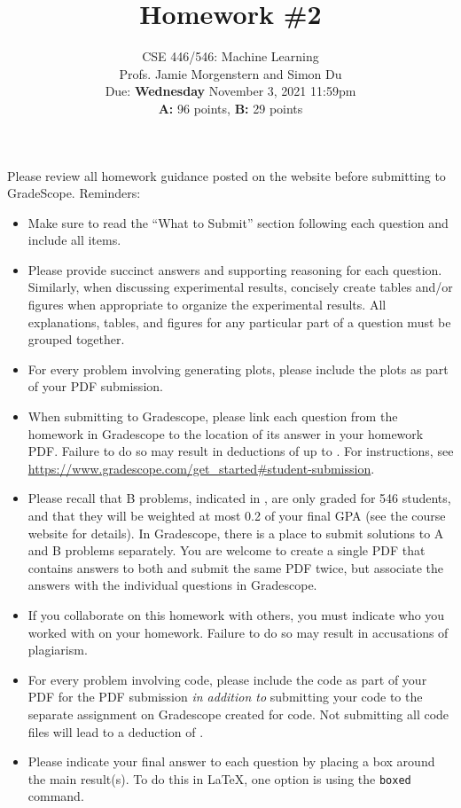 \documentclass{article}
\begin{document}
\setcounter{aprob}{0}
\setcounter{bprob}{0}
\title{Homework \#2}
\author{
    \normalsize{CSE 446/546: Machine Learning}\\
    \normalsize{Profs. Jamie Morgenstern and Simon Du}\\
    \normalsize{Due: \textbf{Wednesday} November 3, 2021 11:59pm}\\
    \normalsize{\textbf{A:} 96 points, \textbf{B:} 29 points}
}
\date{{}}
\maketitle

\noindent Please review all homework guidance posted on the website before submitting to GradeScope. Reminders:
\begin{itemize}
    \item Make sure to read the ``What to Submit'' section following each question and include all items.
    \item Please provide succinct answers and supporting reasoning for each question. Similarly, when discussing experimental results, concisely create tables and/or figures when appropriate to organize the experimental results. All explanations, tables, and figures for any particular part of a question must be grouped together. 
    \item For every problem involving generating plots, please include the plots as part of your PDF submission.
    \item When submitting to Gradescope, please link each question from the homework in Gradescope to the location of its answer in your homework PDF. Failure to do so may result in deductions of up to . For instructions, see \url{https://www.gradescope.com/get_started#student-submission}.
    \item Please recall that B problems, indicated in , are only graded for 546 students, and that they will be weighted at most 0.2 of your final GPA (see the course website for details). In Gradescope, there is a place to submit solutions to A and B problems separately. You are welcome to create a single PDF that contains answers to both and submit the same PDF twice, but associate the answers with the individual questions in Gradescope. 
    \item If you collaborate on this homework with others, you must indicate who you worked with on your homework. Failure to do so may result in accusations of plagiarism.
    \item For every problem involving code, please include the code as part of your PDF for the PDF submission \emph{in addition to} submitting your code to the separate assignment on Gradescope created for code. Not submitting all code files will lead to a deduction of .  
    \item Please indicate your final answer to each question by placing a box around the main result(s). To do this in \LaTeX, one option is using the \texttt{boxed} command.
\end{itemize}
\end{document}
